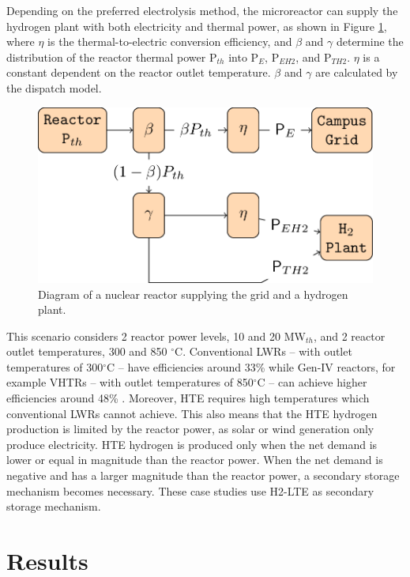 \documentclass{anstrans}
\begin{document}
Depending on the preferred electrolysis method, the microreactor can supply the hydrogen plant with both electricity and thermal power, as shown in Figure \ref{fig:reactor-hydrogen}, where $\eta$ is the thermal-to-electric conversion efficiency, and $\beta$ and $\gamma$ determine the distribution of the reactor thermal power P$_{th}$ into P$_E$, P$_{EH2}$, and P$_{TH2}$.
$\eta$ is a constant dependent on the reactor outlet temperature.
$\beta$ and $\gamma$ are calculated by the dispatch model.

\begin{figure}[htbp!] %
    \centering
    \includegraphics[width=0.90\linewidth]{figures/reactor-hydrogen}
    \hfill
    \caption{Diagram of a nuclear reactor supplying the grid and a hydrogen plant.}
    \label{fig:reactor-hydrogen}
\end{figure}

This scenario considers 2 reactor power levels, 10 and 20 MW$_{th}$, and 2 reactor outlet temperatures, 300 and 850 $^\circ$C.
Conventional \glspl{LWR} -- with outlet temperatures of 300$^\circ$C -- have efficiencies around 33\% while Gen-IV reactors, for example \glspl{VHTR} -- with outlet temperatures of 850$^\circ$C -- can achieve higher efficiencies around 48\% \cite{fairhurst-agosta_multi-physics_2020}.
Moreover, HTE requires high temperatures which conventional LWRs cannot achieve.
This also means that the HTE hydrogen production is limited by the reactor power, as solar or wind generation only produce electricity.
HTE hydrogen is produced only when the net demand is lower or equal in magnitude than the reactor power.
When the net demand is negative and has a larger magnitude than the reactor power, a secondary storage mechanism becomes necessary.
These case studies use H2-LTE as secondary storage mechanism.


\section{Results}
\end{document}
